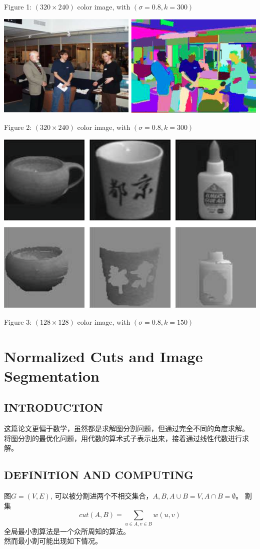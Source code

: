 \documentclass[paper=a4, fontsize=11pt]{scrartcl} %
\numberwithin{equation}{section} %
\numberwithin{figure}{section} %
\numberwithin{table}{section} %
\begin{document}
	Figure 1: $(320 \times 240)$ color image, with $(\sigma = 0.8, k = 300)$

	\includegraphics[scale=0.5]{pic2.png}

	Figure 2: $(320 \times 240)$ color image, with $(\sigma = 0.8, k = 300)$

	\includegraphics[scale=0.5]{pic3.png}

	Figure 3: $(128 \times 128)$ color image, with $(\sigma = 0.8, k = 150)$


\setlength{\parindent}{4em}

\section{Normalized Cuts and Image Segmentation}

\subsection{INTRODUCTION}
	这篇论文更偏于数学，虽然都是求解图分割问题，但通过完全不同的角度求解。
	将图分割的最优化问题，用代数的算术式子表示出来，接着通过线性代数进行求解。

\subsection{DEFINITION AND COMPUTING}
	图$ G = (V, E)$, 可以被分割进两个不相交集合，$A, B, A \cup B = V, A \cap B = \emptyset$。
	割集$$cut(A, B) = \sum\limits_{u \in A, v \in B} w(u, v)$$
	全局最小割算法是一个众所周知的算法。\\
	然而最小割可能出现如下情况。
\end{document}
